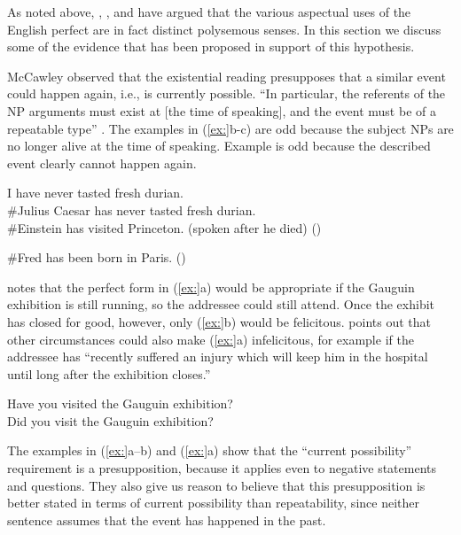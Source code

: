 As noted above, \citet{McCawley1971,McCawley1981}, \citet{Michaelis1994,Michaelis1998}, and \citet{Kiparsky2002} have argued that the various aspectual uses of the English perfect are in fact distinct polysemous senses. In this section we discuss some of the evidence that has been proposed in support of this hypothesis.


McCawley observed that the existential reading presupposes that a similar event could happen again, i.e., is currently possible. “In particular, the referents of the NP arguments must exist at [the time of speaking], and the event must be of a repeatable type” \citep{Kiparsky2002}. The examples in (\ref{ex:}b-c) are odd because the subject NPs are no longer alive at the time of speaking. Example  is odd because the described event clearly cannot happen again. 


\ea
\ea I have never tasted fresh durian.\\
\ex \#Julius Caesar has never tasted fresh durian.\\
\ex \#Einstein has visited Princeton. (spoken after he died) (\citealt{Chomsky1970})
                       \z
\z

\ea
\#Fred has been born in Paris.  (\citealt{Kiparsky2002})
\z


\citet[33]{Leech1971} notes that the perfect form in (\ref{ex:}a) would be appropriate if the Gauguin exhibition is still running, so the addressee could still attend. Once the exhibit has closed for good, however, only (\ref{ex:}b) would be felicitous. \citet[107]{McCawley1971} points out that other circumstances could also make (\ref{ex:}a) infelicitous, for example if the addressee has “recently suffered an injury which will keep him in the hospital until long after the exhibition closes.”


\ea
\ea Have you visited the Gauguin exhibition?\\
\ex Did you visit the Gauguin exhibition?
                       \z
\z


The examples in (\ref{ex:}a--b) and (\ref{ex:}a) show that the “current possibility” requirement is a presupposition, because it applies even to negative statements and questions. They also give us reason to believe that this presupposition is better stated in terms of current possibility than repeatability, since neither sentence assumes that the event has happened in the past.



